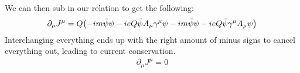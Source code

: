 \documentclass[12pt]{article}
\newcommand{\D}{\partial}
\begin{document}
\begin{enumerate}[label=\alph*)]
  We can then sub in our relation to get the following:
  \begin{align*}
    \D_\mu J^\mu=Q\qty(-im\bar{\psi}\psi-ieQ\bar{\psi}A_\mu\gamma^\mu\psi
    -im\bar{\psi}\psi-ieQ\bar{\psi}\gamma^\mu A_\mu\psi)
  \end{align*}
  Interchanging everything ends up with the right amount of minus signs to cancel everything out, leading to current conservation.
  \begin{align*}
    \boxed{\D_\mu J^\mu=0}
  \end{align*}
\end{enumerate}
\end{document}
